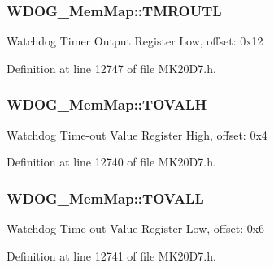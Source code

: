 \subsubsection[{\texorpdfstring{T\+M\+R\+O\+U\+TL}{TMROUTL}}]{ W\+D\+O\+G\+\_\+\+Mem\+Map\+::\+T\+M\+R\+O\+U\+TL}\hypertarget{struct_w_d_o_g___mem_map_a873a6456ac56cb42a5a2ff66ddfefa3c}{}\label{struct_w_d_o_g___mem_map_a873a6456ac56cb42a5a2ff66ddfefa3c}
Watchdog Timer Output Register Low, offset\+: 0x12 

Definition at line 12747 of file M\+K20\+D7.\+h.

\subsubsection[{\texorpdfstring{T\+O\+V\+A\+LH}{TOVALH}}]{ W\+D\+O\+G\+\_\+\+Mem\+Map\+::\+T\+O\+V\+A\+LH}\hypertarget{struct_w_d_o_g___mem_map_ae5ac6a42d85914d2f739b5377734f87a}{}\label{struct_w_d_o_g___mem_map_ae5ac6a42d85914d2f739b5377734f87a}
Watchdog Time-\/out Value Register High, offset\+: 0x4 

Definition at line 12740 of file M\+K20\+D7.\+h.

\subsubsection[{\texorpdfstring{T\+O\+V\+A\+LL}{TOVALL}}]{ W\+D\+O\+G\+\_\+\+Mem\+Map\+::\+T\+O\+V\+A\+LL}\hypertarget{struct_w_d_o_g___mem_map_a2ce5a77ef35f55b7f60a11757dbd758f}{}\label{struct_w_d_o_g___mem_map_a2ce5a77ef35f55b7f60a11757dbd758f}
Watchdog Time-\/out Value Register Low, offset\+: 0x6 

Definition at line 12741 of file M\+K20\+D7.\+h.

